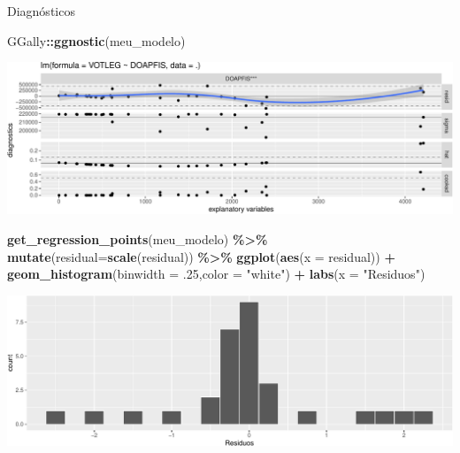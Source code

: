 \documentclass[
  9pt,
  ignorenonframetext,
  aspectratio=169]{beamer}
\newenvironment{Shaded}{\begin{snugshade}}{\end{snugshade}}
\newcommand{\DataTypeTok}[1]{\textcolor[rgb]{0.13,0.29,0.53}{#1}}
\newcommand{\FloatTok}[1]{\textcolor[rgb]{0.00,0.00,0.81}{#1}}
\newcommand{\KeywordTok}[1]{\textcolor[rgb]{0.13,0.29,0.53}{\textbf{#1}}}
\newcommand{\NormalTok}[1]{#1}
\newcommand{\OperatorTok}[1]{\textcolor[rgb]{0.81,0.36,0.00}{\textbf{#1}}}
\newcommand{\StringTok}[1]{\textcolor[rgb]{0.31,0.60,0.02}{#1}}
\begin{document}
\begin{frame}[fragile]{Diagnósticos}
\protect\hypertarget{diagnuxf3sticos}{}
\begin{Shaded}
\begin{Highlighting}[]
\NormalTok{GGally}\OperatorTok{::}\KeywordTok{ggnostic}\NormalTok{(meu\_modelo)}
\end{Highlighting}
\end{Shaded}

\includegraphics{aula_12_files/figure-beamer/unnamed-chunk-17-1.pdf}
\end{frame}

\begin{frame}[fragile]{}
\protect\hypertarget{section-4}{}
\begin{Shaded}
\begin{Highlighting}[]
\KeywordTok{get\_regression\_points}\NormalTok{(meu\_modelo) }\OperatorTok{\%\textgreater{}\%}\StringTok{ }\KeywordTok{mutate}\NormalTok{(}\DataTypeTok{residual=}\KeywordTok{scale}\NormalTok{(residual)) }\OperatorTok{\%\textgreater{}\%}
\StringTok{  }\KeywordTok{ggplot}\NormalTok{(}\KeywordTok{aes}\NormalTok{(}\DataTypeTok{x =}\NormalTok{ residual)) }\OperatorTok{+}
\StringTok{  }\KeywordTok{geom\_histogram}\NormalTok{(}\DataTypeTok{binwidth =} \FloatTok{.25}\NormalTok{,}\DataTypeTok{color =} \StringTok{"white"}\NormalTok{) }\OperatorTok{+}
\StringTok{  }\KeywordTok{labs}\NormalTok{(}\DataTypeTok{x =} \StringTok{"Residuos"}\NormalTok{)}
\end{Highlighting}
\end{Shaded}

\includegraphics{aula_12_files/figure-beamer/unnamed-chunk-18-1.pdf}
\end{frame}
\end{document}
